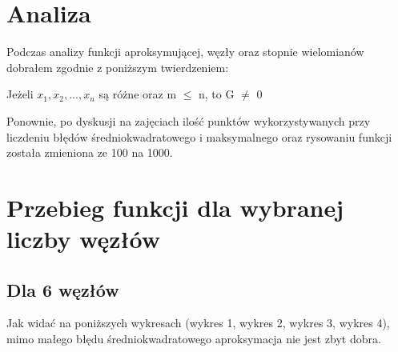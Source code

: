 \documentclass{article}
\begin{document}
\section{Analiza}

Podczas analizy funkcji aproksymującej,
węzły oraz stopnie wielomianów dobrałem zgodnie z poniższym twierdzeniem:

\begin{center}
Jeżeli \(x_1, x_2, ...,x_n\) są różne oraz m \(\le \) n, to G \(\neq \) 0
\end{center}

\noindent

Ponownie, po dyskusji na zajęciach ilość punktów wykorzystywanych przy liczdeniu błędów średniokwadratowego i maksymalnego oraz rysowaniu funkcji została zmieniona ze 100 na 1000.

\newpage

\section{Przebieg funkcji dla wybranej liczby węzłów}

\subsection{Dla 6 węzłów}

\noindent
Jak widać na poniższych wykresach (wykres 1, wykres 2, wykres 3, wykres 4), mimo małego błędu średniokwadratowego aproksymacja nie jest zbyt dobra.
\end{document}
